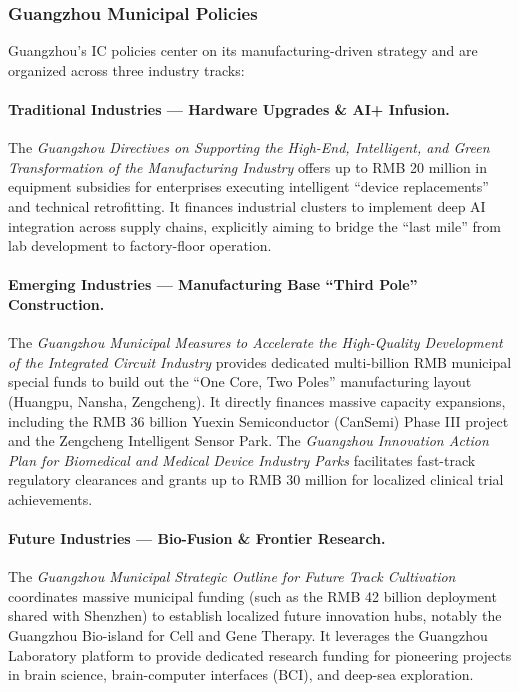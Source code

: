 \documentclass[12pt,a4paper]{article}
\begin{document}
\subsubsection{Guangzhou Municipal Policies}

Guangzhou's IC policies center on its manufacturing-driven strategy and
are organized across three industry tracks:

\paragraph{Traditional Industries — Hardware Upgrades \& AI+ Infusion.}
The \textit{Guangzhou Directives on Supporting the High-End, Intelligent,
and Green Transformation of the Manufacturing Industry} offers up to
RMB 20 million in equipment subsidies for enterprises executing
intelligent ``device replacements'' and technical retrofitting. It
finances industrial clusters to implement deep AI integration across
supply chains, explicitly aiming to bridge the ``last mile'' from lab
development to factory-floor operation.

\paragraph{Emerging Industries — Manufacturing Base ``Third Pole''
Construction.}
The \textit{Guangzhou Municipal Measures to Accelerate the High-Quality
Development of the Integrated Circuit Industry} provides dedicated
multi-billion RMB municipal special funds to build out the ``One Core,
Two Poles'' manufacturing layout (Huangpu, Nansha, Zengcheng). It
directly finances massive capacity expansions, including the RMB 36
billion Yuexin Semiconductor (CanSemi) Phase III project and the
Zengcheng Intelligent Sensor Park. The \textit{Guangzhou Innovation
Action Plan for Biomedical and Medical Device Industry Parks} facilitates
fast-track regulatory clearances and grants up to RMB 30 million for
localized clinical trial achievements.

\paragraph{Future Industries — Bio-Fusion \& Frontier Research.}
The \textit{Guangzhou Municipal Strategic Outline for Future Track
Cultivation} coordinates massive municipal funding (such as the RMB 42
billion deployment shared with Shenzhen) to establish localized future
innovation hubs, notably the Guangzhou Bio-island for Cell and Gene
Therapy. It leverages the Guangzhou Laboratory platform to provide
dedicated research funding for pioneering projects in brain science,
brain-computer interfaces (BCI), and deep-sea exploration.
\end{document}
